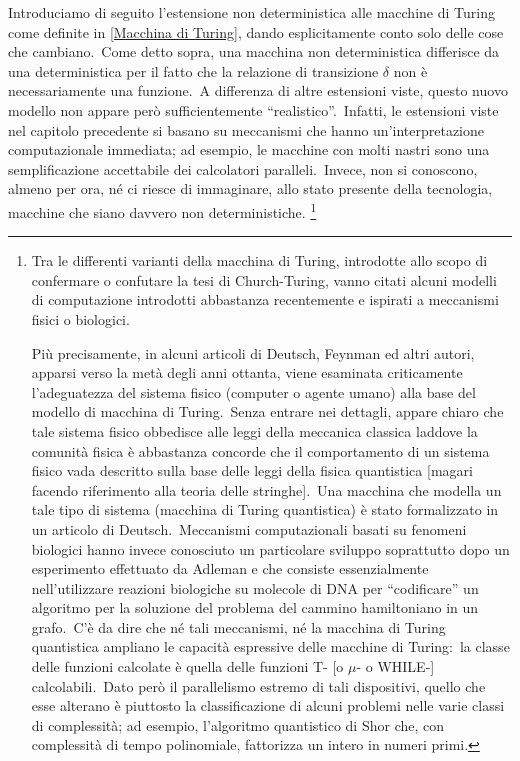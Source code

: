 Introduciamo di seguito l'estensione non deterministica alle macchine di Turing come definite in \ref{Macchina di Turing}, dando esplicitamente conto solo delle cose che cambiano.\
Come detto sopra, una macchina non deterministica differisce da una deterministica per il fatto che la relazione di transizione $\delta$ non è necessariamente una funzione.\
A differenza di altre estensioni viste, questo nuovo modello non appare però sufficientemente ``realistico''.\
Infatti, le estensioni viste nel capitolo precedente si basano su meccanismi che hanno un'interpretazione computazionale immediata; ad esempio, le macchine con molti nastri sono una semplificazione accettabile dei calcolatori paralleli.\
Invece, non si conoscono, almeno per ora, né ci riesce di immaginare, allo stato presente della tecnologia, macchine che siano davvero non deterministiche.
\footnote{Tra le differenti varianti della macchina di Turing, introdotte allo scopo di confermare o confutare la tesi di Church-Turing, vanno citati alcuni modelli di computazione introdotti abbastanza recentemente e ispirati a meccanismi fisici o biologici.\

Più precisamente, in alcuni articoli di Deutsch, Feynman ed altri autori, apparsi verso la metà degli anni ottanta, viene esaminata criticamente l'adeguatezza del sistema fisico (computer o agente umano) alla base del modello di macchina di Turing.\
Senza entrare nei dettagli, appare chiaro che tale sistema fisico obbedisce alle leggi della meccanica classica laddove la comunità fisica è abbastanza concorde che il comportamento di un sistema fisico vada descritto sulla base delle leggi della fisica quantistica [magari facendo riferimento alla teoria delle stringhe].\
Una macchina che modella un tale tipo di sistema (macchina di Turing quantistica) è stato formalizzato in un articolo di Deutsch.\
Meccanismi computazionali basati su fenomeni biologici hanno invece conosciuto un particolare sviluppo soprattutto dopo un esperimento effettuato da Adleman e che consiste essenzialmente nell'utilizzare reazioni biologiche su molecole di DNA per ``codificare'' un algoritmo per la soluzione del problema del cammino hamiltoniano in un grafo.\
C'è da dire che né tali meccanismi, né la macchina di Turing quantistica ampliano le capacità espressive delle macchine di Turing:\ la classe delle funzioni calcolate è quella delle funzioni T- [o $\mu$- o WHILE-] calcolabili.\
Dato però il parallelismo estremo di tali dispositivi, quello che esse alterano è piuttosto la classificazione di alcuni problemi nelle varie classi di complessità; ad esempio, l'algoritmo quantistico di Shor che, con complessità di tempo polinomiale, fattorizza un intero in numeri primi.}

